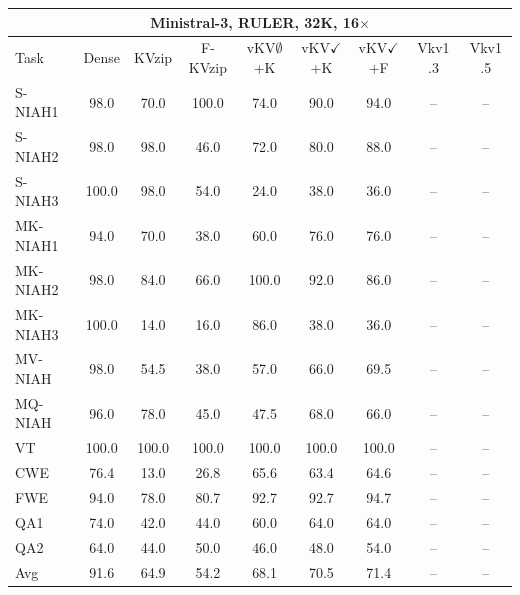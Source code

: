\begin{tabular}{lcccccccc}
\toprule
\multicolumn{9}{c}{Ministral-3, RULER, 32K, 16$\times$} \\
\midrule
Task & Dense & KVzip & F-KVzip & vKV$\emptyset$+K & vKV$\checkmark$+K & vKV$\checkmark$+F & Vkv1 .3 & Vkv1 .5 \\
\midrule
S-NIAH1 & 98.0 & 70.0 & 100.0 & 74.0 & 90.0 & 94.0 & -- & -- \\
S-NIAH2 & 98.0 & 98.0 & 46.0 & 72.0 & 80.0 & 88.0 & -- & -- \\
S-NIAH3 & 100.0 & 98.0 & 54.0 & 24.0 & 38.0 & 36.0 & -- & -- \\
MK-NIAH1 & 94.0 & 70.0 & 38.0 & 60.0 & 76.0 & 76.0 & -- & -- \\
MK-NIAH2 & 98.0 & 84.0 & 66.0 & 100.0 & 92.0 & 86.0 & -- & -- \\
MK-NIAH3 & 100.0 & 14.0 & 16.0 & 86.0 & 38.0 & 36.0 & -- & -- \\
MV-NIAH & 98.0 & 54.5 & 38.0 & 57.0 & 66.0 & 69.5 & -- & -- \\
MQ-NIAH & 96.0 & 78.0 & 45.0 & 47.5 & 68.0 & 66.0 & -- & -- \\
VT & 100.0 & 100.0 & 100.0 & 100.0 & 100.0 & 100.0 & -- & -- \\
CWE & 76.4 & 13.0 & 26.8 & 65.6 & 63.4 & 64.6 & -- & -- \\
FWE & 94.0 & 78.0 & 80.7 & 92.7 & 92.7 & 94.7 & -- & -- \\
QA1 & 74.0 & 42.0 & 44.0 & 60.0 & 64.0 & 64.0 & -- & -- \\
QA2 & 64.0 & 44.0 & 50.0 & 46.0 & 48.0 & 54.0 & -- & -- \\
\midrule
Avg & 91.6 & 64.9 & 54.2 & 68.1 & 70.5 & 71.4 & -- & -- \\
\bottomrule
\end{tabular}
\vspace{0.8em}

